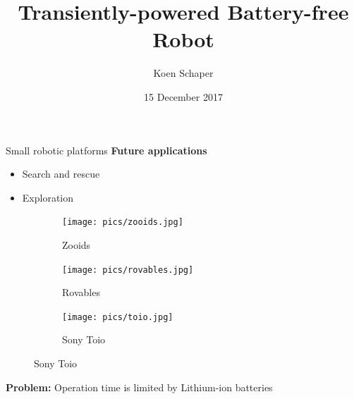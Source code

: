 \documentclass{beamer}
\title[]{Transiently-powered Battery-free Robot}
\institute[]{Delft University of Technology}
\author{Koen Schaper}
\date{15 December 2017}
\begin{document}
{
\frame{\titlepage}
}

{

}

\begin{frame}{Small robotic platforms}
	\textbf{Future applications}
	\begin{itemize}
		\item Search and rescue
		\item Exploration
	\end{itemize}
	\pause
	\begin{figure}
		\centering
		\begin{subfigure}[b]{0.28\textwidth}
			\texttt{[image: pics/zooids.jpg]}
			\caption*{Zooids}
		\end{subfigure}
		\quad
		\begin{subfigure}[b]{0.2825\textwidth}
			\texttt{[image: pics/rovables.jpg]}
			\caption*{Rovables}
		\end{subfigure}
		\quad
		\begin{subfigure}[b]{0.2815\textwidth}
			\texttt{[image: pics/toio.jpg]}
			\caption*{Sony Toio}
		\end{subfigure}
	\end{figure}
	\pause
	\textbf{Problem:} Operation time is limited by Lithium-ion batteries
\end{frame}
\end{document}
